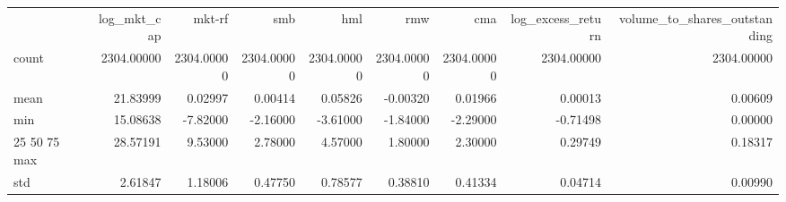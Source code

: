 \begin{tabular}{lrrrrrrrr}
 & log_mkt_cap & mkt-rf & smb & hml & rmw & cma & log_excess_return & volume_to_shares_outstanding \\
count & 2304.00000 & 2304.00000 & 2304.00000 & 2304.00000 & 2304.00000 & 2304.00000 & 2304.00000 & 2304.00000 \\
mean & 21.83999 & 0.02997 & 0.00414 & 0.05826 & -0.00320 & 0.01966 & 0.00013 & 0.00609 \\
min & 15.08638 & -7.82000 & -2.16000 & -3.61000 & -1.84000 & -2.29000 & -0.71498 & 0.00000 \\
25%
50%
75%
max & 28.57191 & 9.53000 & 2.78000 & 4.57000 & 1.80000 & 2.30000 & 0.29749 & 0.18317 \\
std & 2.61847 & 1.18006 & 0.47750 & 0.78577 & 0.38810 & 0.41334 & 0.04714 & 0.00990 \\
\end{tabular}
